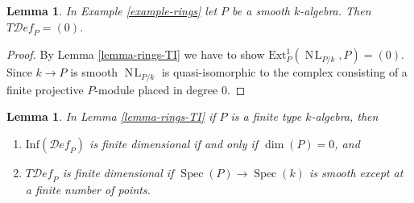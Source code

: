 \documentclass{stacks-project}
\theoremstyle{plain}
\newtheorem{lemma}[subsection]{Lemma}
\theoremstyle{definition}
\theoremstyle{remark}
\numberwithin{equation}{subsection}
\def\Spec{\mathop{\mathrm{Spec}}}
\def\NL{\mathop{N\!L}\nolimits}
\def\Deformationcategory{\mathcal{D}\!\mathit{ef}}
\begin{document}
\begin{lemma}
\label{lemma-smooth}
In Example \ref{example-rings} let $P$ be a smooth $k$-algebra. Then
$T\Deformationcategory_P = (0)$.
\end{lemma}

\begin{proof}
By Lemma \ref{lemma-rings-TI} we have to show
$\text{Ext}^1_P(\NL_{P/k}, P) = (0)$.
Since $k \to P$ is smooth $\NL_{P/k}$ is quasi-isomorphic to the
complex consisting of a finite projective
$P$-module placed in degree $0$.
\end{proof}

\begin{lemma}
\label{lemma-finite-type-rings-TI}
In Lemma \ref{lemma-rings-TI} if $P$ is a finite type $k$-algebra, then
\begin{enumerate}
\item $\text{Inf}(\Deformationcategory_P)$ is finite dimensional if and only if
$\dim(P) = 0$, and
\item $T\Deformationcategory_P$ is finite dimensional if
$\Spec(P) \to \Spec(k)$ is smooth except at a finite number of points.
\end{enumerate}
\end{lemma}
\end{document}
